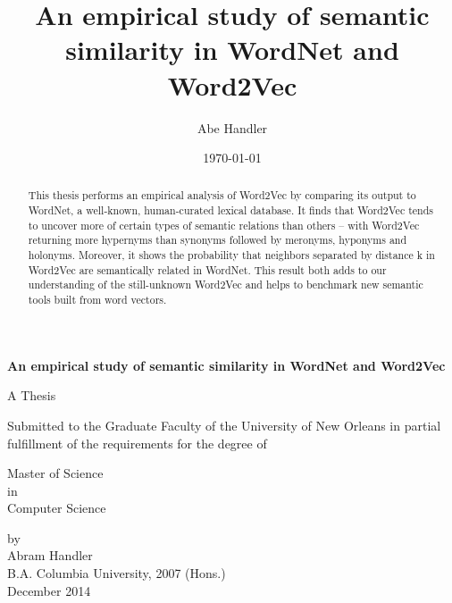 \documentclass[titlepage]{article}
\title{An empirical study of semantic similarity in WordNet and Word2Vec\vspace{5mm}}
\author{Abe Handler}
\date{\today}
\begin{document}
\thispagestyle{empty}
\begin{titlepage}
    \begin{center}
        \vspace{1in}
        
        \LARGE
        \textbf{An empirical study of semantic similarity in WordNet and Word2Vec}
        
        \vspace{3cm}
        A Thesis
        \vspace{3cm}
        
        Submitted to the Graduate Faculty of the 
        University of New Orleans 
        in partial fulfillment of the 
        requirements for the degree of 
        
        
        \vspace{2cm}
        
        Master of Science \\ in \\ Computer Science 
       
        \vspace{2cm}
        
        \vfill
        
        by \\
        \vspace{1cm}
        Abram Handler \\ 
        \vspace{1cm} 
        B.A. Columbia University, 2007 (Hons.) \\
        \vspace{1cm}
        December 2014
    \end{center}
\end{titlepage}

\setcounter{page}{2}
\tableofcontents

\Large
\begin{abstract}
This thesis performs an empirical analysis of Word2Vec by comparing its output to WordNet, a well-known, human-curated lexical database. It finds that Word2Vec tends to uncover more of certain types of semantic relations than others -- with Word2Vec returning more hypernyms than synonyms followed by meronyms, hyponyms and holonyms. Moreover, it shows the probability that neighbors separated by distance k in Word2Vec are semantically related in WordNet. This result both adds to our understanding of the still-unknown Word2Vec and helps to benchmark new semantic tools built from word vectors. 
\end{abstract}
\end{document}
